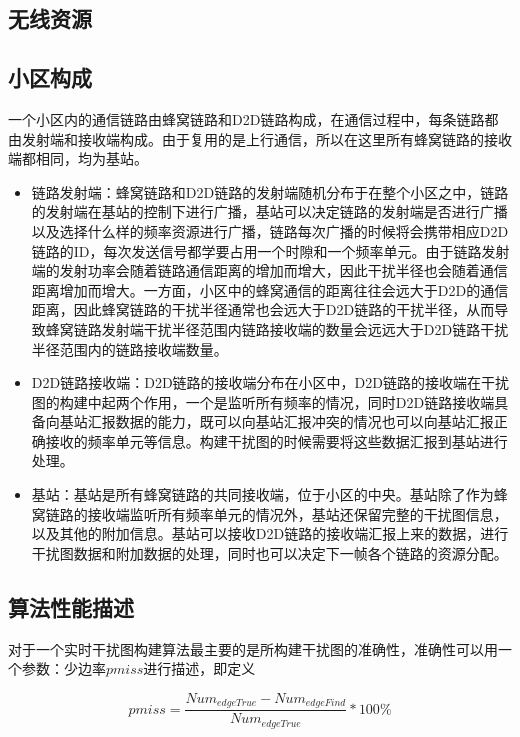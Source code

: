 \documentclass[figurelist,tablelist,algorithmlist,nomlist,masters]{seuthesix}
\begin{document}
	\subsection{无线资源}
	\subsection{小区构成}
	一个小区内的通信链路由蜂窝链路和D2D链路构成，在通信过程中，每条链路都由发射端和接收端构成。由于复用的是上行通信，所以在这里所有蜂窝链路的接收端都相同，均为基站。
	\begin{itemize}
		\item 链路发射端：蜂窝链路和D2D链路的发射端随机分布于在整个小区之中，链路的发射端在基站的控制下进行广播，基站可以决定链路的发射端是否进行广播以及选择什么样的频率资源进行广播，链路每次广播的时候将会携带相应D2D链路的ID，每次发送信号都学要占用一个时隙和一个频率单元。由于链路发射端的发射功率会随着链路通信距离的增加而增大，因此干扰半径也会随着通信距离增加而增大。一方面，小区中的蜂窝通信的距离往往会远大于D2D的通信距离，因此蜂窝链路的干扰半径通常也会远大于D2D链路的干扰半径，从而导致蜂窝链路发射端干扰半径范围内链路接收端的数量会远远大于D2D链路干扰半径范围内的链路接收端数量。
		
		\item D2D链路接收端：D2D链路的接收端分布在小区中，D2D链路的接收端在干扰图的构建中起两个作用，一个是监听所有频率的情况，同时D2D链路接收端具备向基站汇报数据的能力，既可以向基站汇报冲突的情况也可以向基站汇报正确接收的频率单元等信息。构建干扰图的时候需要将这些数据汇报到基站进行处理。
		
		\item 基站：基站是所有蜂窝链路的共同接收端，位于小区的中央。基站除了作为蜂窝链路的接收端监听所有频率单元的情况外，基站还保留完整的干扰图信息，以及其他的附加信息。基站可以接收D2D链路的接收端汇报上来的数据，进行干扰图数据和附加数据的处理，同时也可以决定下一帧各个链路的资源分配。
		
	\end{itemize}
	
	\subsection{算法性能描述}
	对于一个实时干扰图构建算法最主要的是所构建干扰图的准确性，准确性可以用一个参数：少边率$pmiss$进行描述，即定义
	
	\begin{equation}\label{eq2.1}
	{pmiss} = \frac{{Nu{m_{edgeTrue}} - Nu{m_{edgeFind}}}}{{Nu{m_{edgeTrue}}}}*100\% 
	\end{equation}
	
\end{document}

